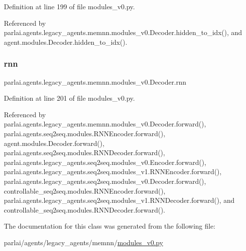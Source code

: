 Definition at line 199 of file modules\+\_\+v0.\+py.



Referenced by parlai.\+agents.\+legacy\+\_\+agents.\+memnn.\+modules\+\_\+v0.\+Decoder.\+hidden\+\_\+to\+\_\+idx(), and agent.\+modules.\+Decoder.\+hidden\+\_\+to\+\_\+idx().

\mbox{\label{classparlai_1_1agents_1_1legacy__agents_1_1memnn_1_1modules__v0_1_1Decoder_aa5c0e1fd441c2c00358fa1fc64e86013}} 
\subsubsection{\texorpdfstring{rnn}{rnn}}
{\footnotesize\ttfamily parlai.\+agents.\+legacy\+\_\+agents.\+memnn.\+modules\+\_\+v0.\+Decoder.\+rnn}



Definition at line 201 of file modules\+\_\+v0.\+py.



Referenced by parlai.\+agents.\+legacy\+\_\+agents.\+memnn.\+modules\+\_\+v0.\+Decoder.\+forward(), parlai.\+agents.\+seq2seq.\+modules.\+R\+N\+N\+Encoder.\+forward(), agent.\+modules.\+Decoder.\+forward(), parlai.\+agents.\+seq2seq.\+modules.\+R\+N\+N\+Decoder.\+forward(), parlai.\+agents.\+legacy\+\_\+agents.\+seq2seq.\+modules\+\_\+v0.\+Encoder.\+forward(), parlai.\+agents.\+legacy\+\_\+agents.\+seq2seq.\+modules\+\_\+v1.\+R\+N\+N\+Encoder.\+forward(), parlai.\+agents.\+legacy\+\_\+agents.\+seq2seq.\+modules\+\_\+v0.\+Decoder.\+forward(), controllable\+\_\+seq2seq.\+modules.\+R\+N\+N\+Encoder.\+forward(), parlai.\+agents.\+legacy\+\_\+agents.\+seq2seq.\+modules\+\_\+v1.\+R\+N\+N\+Decoder.\+forward(), and controllable\+\_\+seq2seq.\+modules.\+R\+N\+N\+Decoder.\+forward().



The documentation for this class was generated from the following file\+:\begin{DoxyCompactItemize}
\item 
parlai/agents/legacy\+\_\+agents/memnn/\hyperlink{memnn_2modules__v0_8py}{modules\+\_\+v0.\+py}\end{DoxyCompactItemize}

